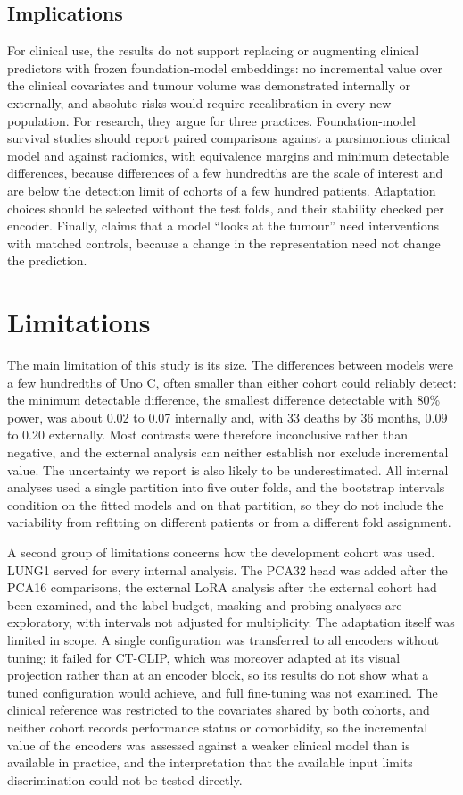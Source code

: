 \subsection{Implications}
For clinical use, the results do not support replacing or augmenting clinical predictors with frozen foundation-model embeddings: no incremental value over the clinical covariates and tumour volume was demonstrated internally or externally, and absolute risks would require recalibration in every new population. For research, they argue for three practices. Foundation-model survival studies should report paired comparisons against a parsimonious clinical model and against radiomics, with equivalence margins and minimum detectable differences, because differences of a few hundredths are the scale of interest and are below the detection limit of cohorts of a few hundred patients. Adaptation choices should be selected without the test folds, and their stability checked per encoder. Finally, claims that a model ``looks at the tumour'' need interventions with matched controls, because a change in the representation need not change the prediction.

\section{Limitations}\label{sec:limitations}
The main limitation of this study is its size. The differences between models were a few hundredths of Uno C, often smaller than either cohort could reliably detect: the minimum detectable difference, the smallest difference detectable with 80\% power, was about 0.02 to 0.07 internally and, with 33 deaths by 36 months, 0.09 to 0.20 externally. Most contrasts were therefore inconclusive rather than negative, and the external analysis can neither establish nor exclude incremental value. The uncertainty we report is also likely to be underestimated. All internal analyses used a single partition into five outer folds, and the bootstrap intervals condition on the fitted models and on that partition, so they do not include the variability from refitting on different patients or from a different fold assignment.

A second group of limitations concerns how the development cohort was used. LUNG1 served for every internal analysis. The PCA32 head was added after the PCA16 comparisons, the external LoRA analysis after the external cohort had been examined, and the label-budget, masking and probing analyses are exploratory, with intervals not adjusted for multiplicity. The adaptation itself was limited in scope. A single configuration was transferred to all encoders without tuning; it failed for CT-CLIP, which was moreover adapted at its visual projection rather than at an encoder block, so its results do not show what a tuned configuration would achieve, and full fine-tuning was not examined. The clinical reference was restricted to the covariates shared by both cohorts, and neither cohort records performance status or comorbidity, so the incremental value of the encoders was assessed against a weaker clinical model than is available in practice, and the interpretation that the available input limits discrimination could not be tested directly.

